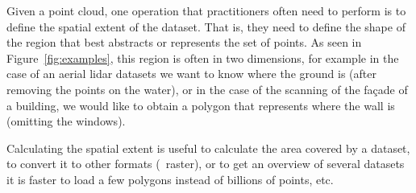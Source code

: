 Given a point cloud, one operation that practitioners often need to perform is to define the spatial extent of the dataset.
That is, they need to define the shape of the region that best abstracts or represents the set of points.
As seen in Figure~\ref{fig:examples}, this region is often in two dimensions, for example in the case of an aerial lidar datasets we want to know where the ground is (after removing the points on the water), or in the case of the scanning of the façade of a building, we would like to obtain a polygon that represents where the wall is (omitting the windows).

%

Calculating the spatial extent is useful to calculate the area covered by a dataset, to convert it to other formats (\eg\ raster), or to get an overview of several datasets it is faster to load a few polygons instead of billions of points, etc.

%

